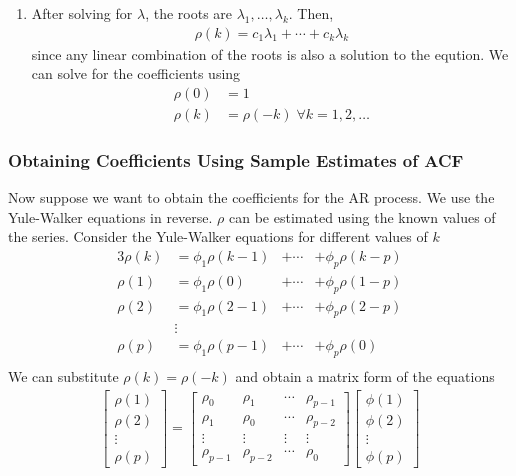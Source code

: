 \documentclass[../../time_series_notes.tex]{subfiles}
\begin{document}
\begin{enumerate}
    \item After solving for $\lambda$, the roots are $\lambda_{1}, \ldots, \lambda_{k}$. Then,
    \begin{align*}
        \rho(k) = c_{1}\lambda_{1} + \cdots + c_{k}\lambda_{k}
    \end{align*}
    since any linear combination of the roots is also a solution to the eqution. We can solve for the coefficients using
    \begin{align*}
        \rho(0) &= 1\\
        \rho(k) &= \rho(-k) \; \forall k=1,2,\ldots
    \end{align*}
\end{enumerate}

\subsubsection*{Obtaining Coefficients Using Sample Estimates of ACF}
Now suppose we want to obtain the coefficients for the AR process. We use the Yule-Walker equations in reverse. $\rho$ can be estimated using the known values of the series. Consider the Yule-Walker equations for different values of $k$
\begin{alignat*}{3}
    \rho(k) &= \phi_{1}\rho(k-1) &+ \cdots &+ \phi_{p}\rho(k-p)\\
    \rho(1) &= \phi_{1}\rho(0) &+ \cdots &+ \phi_{p}\rho(1-p)\\
    \rho(2) &= \phi_{1}\rho(2-1) &+ \cdots &+ \phi_{p}\rho(2-p)\\
    &\vdots\\
    \rho(p) &= \phi_{1}\rho(p-1) &+ \cdots &+ \phi_{p}\rho(0)\\
\end{alignat*}
We can substitute $\rho(k) = \rho(-k)$ and obtain a matrix form of the equations
\begin{align*}
    \begin{bmatrix}
        \rho(1)\\
        \rho(2)\\
        \vdots\\
        \rho(p)
    \end{bmatrix}
    =
    \begin{bmatrix}
        \rho_{0} &\rho_{1} &\cdots &\rho_{p-1}\\
        \rho_{1} &\rho_{0} &\cdots &\rho_{p-2}\\
        \vdots &\vdots &\vdots &\vdots\\
        \rho_{p-1} &\rho_{p-2} &\cdots &\rho_{0}
    \end{bmatrix}
    \begin{bmatrix}
        \phi(1)\\
        \phi(2)\\
        \vdots\\
        \phi(p)
    \end{bmatrix}
\end{align*}
\end{document}
